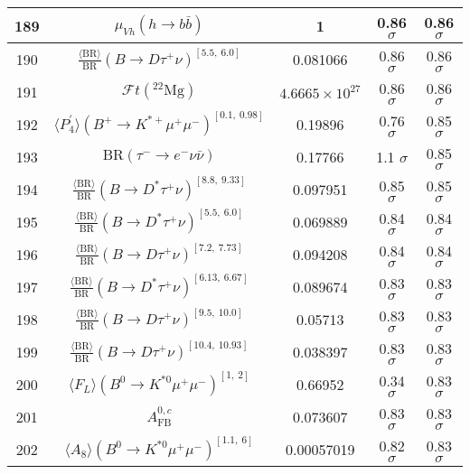 \begin{longtable}{|c|c|c|c|c|}
189 &	 $\mu_{Vh}(h \to b\bar b)$ &	 1 &	 \cellcolor{green!0}0.86 $ \sigma$ &	 0.86 $ \sigma$ \\ \hline
190 &	 $\frac{\langle \mathrm{BR} \rangle}{\mathrm{BR}}(B\to D\tau^+\nu)^{[5.5,\  6.0]}$ &	 0.081066 &	 \cellcolor{green!0}0.86 $ \sigma$ &	 0.86 $ \sigma$ \\ \hline
191 &	 $\mathcal{F}t({}^{22}\mathrm{Mg})$ &	 $4.6665\times 10^{27}$ &	 \cellcolor{red!0}0.86 $ \sigma$ &	 0.86 $ \sigma$ \\ \hline
192 &	 $\langle P_4^\prime\rangle(B^+\to K^{\ast +}\mu^+\mu^-)^{[0.1,\  0.98]}$ &	 0.19896 &	 \cellcolor{green!4}0.76 $ \sigma$ &	 0.85 $ \sigma$ \\ \hline
193 &	 $\mathrm{BR}(\tau^-\to e^- \nu\bar\nu)$ &	 0.17766 &	 \cellcolor{red!11}1.1 $ \sigma$ &	 0.85 $ \sigma$ \\ \hline
194 &	 $\frac{\langle \mathrm{BR} \rangle}{\mathrm{BR}}(B\to D^\ast\tau^+\nu)^{[8.8,\  9.33]}$ &	 0.097951 &	 \cellcolor{green!0}0.85 $ \sigma$ &	 0.85 $ \sigma$ \\ \hline
195 &	 $\frac{\langle \mathrm{BR} \rangle}{\mathrm{BR}}(B\to D^\ast\tau^+\nu)^{[5.5,\  6.0]}$ &	 0.069889 &	 \cellcolor{green!0}0.84 $ \sigma$ &	 0.84 $ \sigma$ \\ \hline
196 &	 $\frac{\langle \mathrm{BR} \rangle}{\mathrm{BR}}(B\to D\tau^+\nu)^{[7.2,\  7.73]}$ &	 0.094208 &	 \cellcolor{red!0}0.84 $ \sigma$ &	 0.84 $ \sigma$ \\ \hline
197 &	 $\frac{\langle \mathrm{BR} \rangle}{\mathrm{BR}}(B\to D^\ast\tau^+\nu)^{[6.13,\  6.67]}$ &	 0.089674 &	 \cellcolor{green!0}0.83 $ \sigma$ &	 0.83 $ \sigma$ \\ \hline
198 &	 $\frac{\langle \mathrm{BR} \rangle}{\mathrm{BR}}(B\to D\tau^+\nu)^{[9.5,\  10.0]}$ &	 0.05713 &	 \cellcolor{green!0}0.83 $ \sigma$ &	 0.83 $ \sigma$ \\ \hline
199 &	 $\frac{\langle \mathrm{BR} \rangle}{\mathrm{BR}}(B\to D\tau^+\nu)^{[10.4,\  10.93]}$ &	 0.038397 &	 \cellcolor{green!0}0.83 $ \sigma$ &	 0.83 $ \sigma$ \\ \hline
200 &	 $\langle F_L\rangle(B^0\to K^{\ast 0}\mu^+\mu^-)^{[1,\  2]}$ &	 0.66952 &	 \cellcolor{green!24}0.34 $ \sigma$ &	 0.83 $ \sigma$ \\ \hline
201 &	 $A_\mathrm{FB}^{0, c}$ &	 0.073607 &	 \cellcolor{red!0}0.83 $ \sigma$ &	 0.83 $ \sigma$ \\ \hline
202 &	 $\langle A_8\rangle(B^0\to K^{\ast 0}\mu^+\mu^-)^{[1.1,\  6]}$ &	 0.00057019 &	 \cellcolor{green!0}0.82 $ \sigma$ &	 0.83 $ \sigma$ \\ \hline

\end{longtable}
